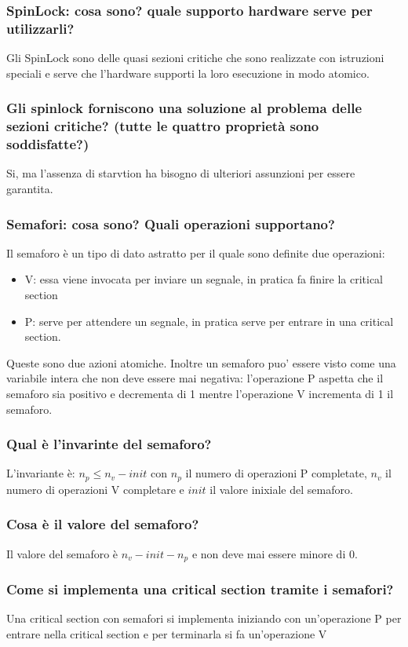 \documentclass{article}
\begin{document}
\subsubsection{SpinLock: cosa sono? quale supporto hardware serve per utilizzarli?}
Gli SpinLock sono delle quasi sezioni critiche che sono realizzate con
istruzioni speciali e serve che l'hardware supporti la loro esecuzione in modo
atomico.

\subsubsection{Gli spinlock forniscono una soluzione al problema delle sezioni critiche?
    (tutte le quattro proprietà sono soddisfatte?)}
Si, ma l'assenza di starvtion ha bisogno di ulteriori assunzioni per essere
garantita.

\subsubsection{Semafori: cosa sono? Quali operazioni supportano?}
Il semaforo è un tipo di dato astratto per il quale sono definite due
operazioni:
\begin{itemize}
    \item V: essa viene invocata per inviare un segnale, in pratica fa finire la critical
          section
    \item P: serve per attendere un segnale, in pratica serve per entrare in una critical
          section.
\end{itemize}
Queste sono due azioni atomiche. Inoltre un semaforo puo' essere visto come una variabile intera che non deve essere mai negativa: l'operazione P aspetta che il semaforo sia positivo e decrementa di 1
mentre l'operazione V incrementa di 1 il semaforo.
\subsubsection{Qual è l'invarinte del semaforo?}
L'invariante è: $n_p \leq n_v - init$ con $n_p$ il numero di operazioni P
completate, $n_v$ il numero di operazioni V completare e $init$ il valore
inixiale del semaforo.

\subsubsection{Cosa è il valore del semaforo?}
Il valore del semaforo è $n_v - init - n_p$ e non deve mai essere minore di 0.

\subsubsection{Come si implementa una critical section tramite i semafori?}
Una critical section con semafori si implementa iniziando con un'operazione P
per entrare nella critical section e per terminarla si fa un'operazione V
\end{document}
